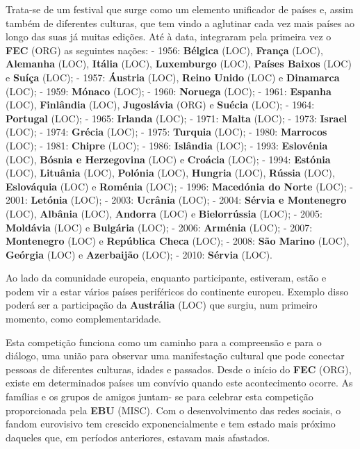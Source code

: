 \documentclass[12pt,a4paper]{article}
\begin{document}
Trata-se de um festival que surge como um elemento unificador de países e, assim também de diferentes culturas, que tem vindo a aglutinar cada vez mais países ao longo das suas já muitas edições. Até à data, integraram pela primeira vez o \textbf{FEC} (ORG) as seguintes nações: - 1956: \textbf{Bélgica} (LOC), \textbf{França} (LOC), \textbf{Alemanha} (LOC), \textbf{Itália} (LOC), \textbf{Luxemburgo} (LOC), \textbf{Países Baixos} (LOC) e \textbf{Suíça} (LOC); - 1957: \textbf{Áustria} (LOC), \textbf{Reino Unido} (LOC) e \textbf{Dinamarca} (LOC); - 1959: \textbf{Mónaco} (LOC); - 1960: \textbf{Noruega} (LOC); - 1961: \textbf{Espanha} (LOC), \textbf{Finlândia} (LOC), \textbf{Jugoslávia} (ORG) e \textbf{Suécia} (LOC); - 1964: \textbf{Portugal} (LOC); - 1965: \textbf{Irlanda} (LOC); - 1971: \textbf{Malta} (LOC); - 1973: \textbf{Israel} (LOC); - 1974: \textbf{Grécia} (LOC); - 1975: \textbf{Turquia} (LOC); - 1980: \textbf{Marrocos} (LOC); - 1981: \textbf{Chipre} (LOC); - 1986: \textbf{Islândia} (LOC); - 1993: \textbf{Eslovénia} (LOC), \textbf{Bósnia e Herzegovina} (LOC) e \textbf{Croácia} (LOC); - 1994: \textbf{Estónia} (LOC), \textbf{Lituânia} (LOC), \textbf{Polónia} (LOC), \textbf{Hungria} (LOC), \textbf{Rússia} (LOC), \textbf{Eslováquia} (LOC) e \textbf{Roménia} (LOC); - 1996: \textbf{Macedónia do Norte} (LOC); - 2001: \textbf{Letónia} (LOC); - 2003: \textbf{Ucrânia} (LOC); - 2004: \textbf{Sérvia e Montenegro} (LOC), \textbf{Albânia} (LOC), \textbf{Andorra} (LOC) e \textbf{Bielorrússia} (LOC); - 2005: \textbf{Moldávia} (LOC) e \textbf{Bulgária} (LOC); - 2006: \textbf{Arménia} (LOC); - 2007: \textbf{Montenegro} (LOC) e \textbf{República Checa} (LOC); - 2008: \textbf{São Marino} (LOC), \textbf{Geórgia} (LOC) e \textbf{Azerbaijão} (LOC); - 2010: \textbf{Sérvia} (LOC).

Ao lado da comunidade europeia, enquanto participante, estiveram, estão e podem vir a estar vários países periféricos do continente europeu. Exemplo disso poderá ser a participação da \textbf{Austrália} (LOC) que surgiu, num primeiro momento, como complementaridade.

Esta competição funciona como um caminho para a compreensão e para o diálogo, uma união para observar uma manifestação cultural que pode conectar pessoas de diferentes culturas, idades e passados. Desde o início do \textbf{FEC} (ORG), existe em determinados países um convívio quando este acontecimento ocorre. As famílias e os grupos de amigos juntam- se para celebrar esta competição proporcionada pela \textbf{EBU} (MISC). Com o desenvolvimento das redes  sociais,  o fandom eurovisivo  tem  crescido  exponencialmente  e  tem  estado  mais próximo daqueles que, em períodos anteriores, estavam mais afastados.
\end{document}

